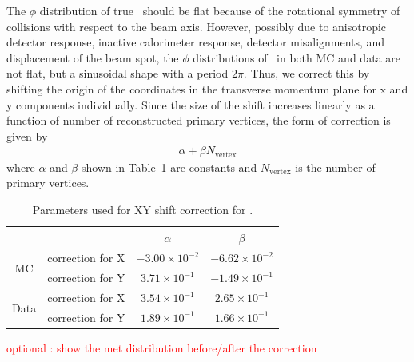 The $\phi$ distribution of true \met\ should be flat because of the rotational 
symmetry of collisions with respect to the beam axis. However, possibly due to 
anisotropic detector response, inactive calorimeter response, detector misalignments, 
and displacement of the beam spot, the $\phi$ distributions of \met\ in both 
MC and data are not flat, but a sinusoidal shape with a period $2\pi$. 
Thus, we correct this by shifting the origin of the coordinates 
in the transverse momentum plane for x and y components individually. 
Since the size of the shift increases 
linearly as a function of number of reconstructed primary vertices, 
the form of correction is given by 
\begin{eqnarray} 
\alpha + \beta N_{\textrm{vertex}}
\end{eqnarray} 
where $\alpha$ and $\beta$ shown in Table~\ref{tab:metxycorrection} are constants 
and $N_{\textrm{vertex}}$ is the number of primary vertices. 
\begin{table}[htp] 
\begin{center} 
\begin{tabular}{c||c|c|c} 
\hline 
                       &                  & $\alpha$ &  $\beta$  \\
\hline \hline 
\multirow{2}{*}{MC}    & correction for X & $-3.00 \times 10^{-2}$ & $-6.62\times 10^{-2}$  \\
                       & correction for Y & $3.71\times 10^{-1}$   & $-1.49\times 10^{-1}$  \\
\hline 
\multirow{2}{*}{Data}  & correction for X & $3.54\times 10^{-1}$   & $2.65\times 10^{-1}$   \\
                       & correction for Y & $1.89\times 10^{-1}$   & $1.66\times 10^{-1}$   \\
\hline 
\end{tabular} 
\caption{Parameters used for XY shift correction for \met.} 
\label{tab:metxycorrection} 
\end{center} 
\end{table} 
\textcolor{red}{optional : show the met distribution before/after the correction}

